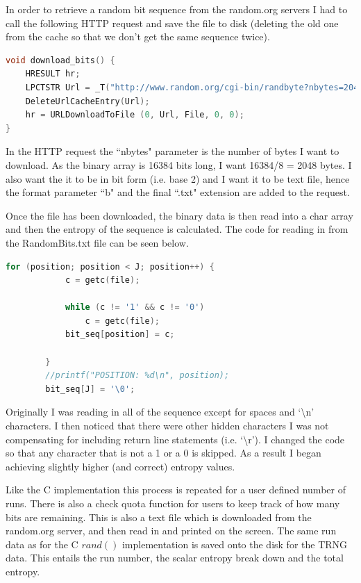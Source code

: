 \documentclass[a4paper,10.5pt]{article}
\begin{document}
In order to retrieve a random bit sequence from the random.org servers I had to call the following HTTP request and save the file to disk (deleting the old one from the cache so that we don't get the same sequence twice).

\begin{lstlisting}[language=C]
void download_bits() {
	HRESULT hr;
	LPCTSTR Url = _T("http://www.random.org/cgi-bin/randbyte?nbytes=2048&format=b.txt"), File = _T("RandomBits.txt");
	DeleteUrlCacheEntry(Url);
	hr = URLDownloadToFile (0, Url, File, 0, 0);
}
\end{lstlisting}

In the HTTP request the ``nbytes" parameter is the number of bytes I want to download. As the binary array is 16384 bits long, I want 16384/8 = 2048 bytes. I also want the it to be in bit form (i.e. base 2) and I want it to be text file, hence the format parameter ``b" and the final ``.txt" extension are added to the request. 

Once the file has been downloaded, the binary data is then read into a char array and then the entropy of the sequence is calculated. The code for reading in from the RandomBits.txt file can be seen below. 

\begin{lstlisting}[language=C]
for (position; position < J; position++) {
			c = getc(file);

			while (c != '1' && c != '0')
				c = getc(file);
			bit_seq[position] = c;

		}
		//printf("POSITION: %d\n", position);
		bit_seq[J] = '\0';
\end{lstlisting}

Originally I was reading in all of the sequence except for spaces and `\textbackslash n' characters. I then noticed that there were other hidden characters I was not compensating for including return line statements (i.e. `\textbackslash r'). I changed the code so that any character that is not a 1 or a 0 is skipped. As a result I began achieving slightly higher (and correct) entropy values.

Like the C implementation this process is repeated for a user defined number of runs. There is also a check quota function for users to keep track of how many bits are remaining. This is also a text file which is downloaded from the random.org server, and then read in and printed on the screen. The same run data as for the C $rand()$ implementation is saved onto the disk for the TRNG data. This entails the run number, the scalar entropy break down and the total entropy.
\end{document}
